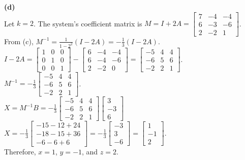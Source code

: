 \begin{solution}
\medskip
\textbf{(d)} \\
Let $k = 2$. The system's coefficient matrix is $M = I + 2A = \begin{bmatrix} 7 & -4 & -4 \\ 6 & -3 & -6 \\ 2 & -2 & 1 \end{bmatrix}$. \\
From (c), $M^{-1} = \frac{1}{1-2^2}(I - 2A) = -\frac{1}{3}(I - 2A)$. \\
$I - 2A = \begin{bmatrix} 1 & 0 & 0 \\ 0 & 1 & 0 \\ 0 & 0 & 1 \end{bmatrix} - \begin{bmatrix} 6 & -4 & -4 \\ 6 & -4 & -6 \\ 2 & -2 & 0 \end{bmatrix} = \begin{bmatrix} -5 & 4 & 4 \\ -6 & 5 & 6 \\ -2 & 2 & 1 \end{bmatrix}$. \\
$M^{-1} = -\frac{1}{3} \begin{bmatrix} -5 & 4 & 4 \\ -6 & 5 & 6 \\ -2 & 2 & 1 \end{bmatrix}$. \\
$X = M^{-1}B = -\frac{1}{3} \begin{bmatrix} -5 & 4 & 4 \\ -6 & 5 & 6 \\ -2 & 2 & 1 \end{bmatrix} \begin{bmatrix} 3 \\ -3 \\ 6 \end{bmatrix}$ \\
$X = -\frac{1}{3} \begin{bmatrix} -15 - 12 + 24 \\ -18 - 15 + 36 \\ -6 - 6 + 6 \end{bmatrix} = -\frac{1}{3} \begin{bmatrix} -3 \\ 3 \\ -6 \end{bmatrix} = \begin{bmatrix} 1 \\ -1 \\ 2 \end{bmatrix}$. \\
Therefore, $x = 1$, $y = -1$, and $z = 2$.
\end{solution}

